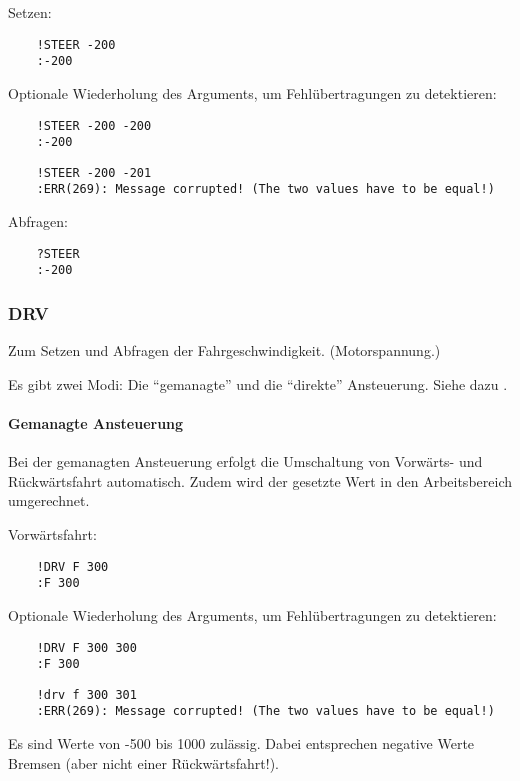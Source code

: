 Setzen:
\begin{verbatim}
	!STEER -200
	:-200
\end{verbatim}

Optionale Wiederholung des Arguments, um Fehlübertragungen zu detektieren:
\begin{verbatim}
	!STEER -200 -200
	:-200
\end{verbatim}

\begin{verbatim}
	!STEER -200 -201
	:ERR(269): Message corrupted! (The two values have to be equal!)
\end{verbatim}



Abfragen:
\begin{verbatim}
	?STEER
	:-200
\end{verbatim}



\subsubsection{DRV}

Zum Setzen und Abfragen der Fahrgeschwindigkeit. (\Bzw Motorspannung.)

Es gibt zwei Modi: Die "`gemanagte"' und die "`direkte"' Ansteuerung. Siehe dazu .


\paragraph{Gemanagte Ansteuerung}

Bei der gemanagten Ansteuerung erfolgt die Umschaltung von Vorwärts- und Rückwärtsfahrt automatisch. Zudem wird der gesetzte Wert in den Arbeitsbereich umgerechnet.

Vorwärtsfahrt:
\begin{verbatim}
	!DRV F 300
	:F 300
\end{verbatim}
Optionale Wiederholung des Arguments, um Fehlübertragungen zu detektieren:
\begin{verbatim}
	!DRV F 300 300
	:F 300
\end{verbatim}

\begin{verbatim}
	!drv f 300 301
	:ERR(269): Message corrupted! (The two values have to be equal!)
\end{verbatim}


Es sind Werte von -500 bis 1000 zulässig. Dabei entsprechen negative Werte Bremsen (aber nicht einer Rückwärtsfahrt!).

